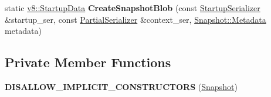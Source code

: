 \begin{DoxyCompactItemize}
\item 
static \hyperlink{classv8_1_1_startup_data}{v8\+::\+Startup\+Data} {\bfseries Create\+Snapshot\+Blob} (const \hyperlink{classv8_1_1internal_1_1_startup_serializer}{Startup\+Serializer} \&startup\+\_\+ser, const \hyperlink{classv8_1_1internal_1_1_partial_serializer}{Partial\+Serializer} \&context\+\_\+ser, \hyperlink{classv8_1_1internal_1_1_snapshot_1_1_metadata}{Snapshot\+::\+Metadata} metadata)\hypertarget{classv8_1_1internal_1_1_snapshot_a510bc272524de9953b069c3d944ce866}{}\label{classv8_1_1internal_1_1_snapshot_a510bc272524de9953b069c3d944ce866}

\end{DoxyCompactItemize}
\subsection*{Private Member Functions}
\begin{DoxyCompactItemize}
\item 
{\bfseries D\+I\+S\+A\+L\+L\+O\+W\+\_\+\+I\+M\+P\+L\+I\+C\+I\+T\+\_\+\+C\+O\+N\+S\+T\+R\+U\+C\+T\+O\+RS} (\hyperlink{classv8_1_1internal_1_1_snapshot}{Snapshot})\hypertarget{classv8_1_1internal_1_1_snapshot_a70e107f43ec535d40f77cd8f2cb48c82}{}\label{classv8_1_1internal_1_1_snapshot_a70e107f43ec535d40f77cd8f2cb48c82}

\end{DoxyCompactItemize}
